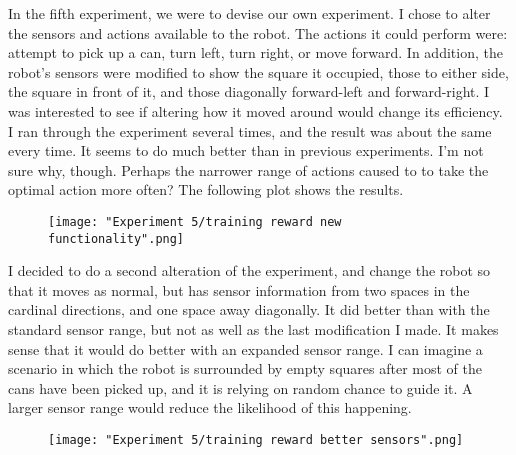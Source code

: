 \documentclass{article}
\begin{document}
\begin{flushleft}
In the fifth experiment, we were to devise our own experiment.  I chose to alter the sensors and actions available to the robot.  The actions it could perform were: attempt to pick up a can, turn left, turn right, or move forward.  In addition, the robot's sensors were modified to show the square it occupied, those to either side, the square in front of it, and those diagonally forward-left and forward-right.  I was interested to see if altering how it moved around would change its efficiency.  I ran through the experiment several times, and the result was about the same every time.  It seems to do much better than in previous experiments.  I'm not sure why, though.  Perhaps the narrower range of actions caused to to take the optimal action more often?  The following plot shows the results.
\end{flushleft}

\begin{figure}[h!]
    \noindent\texttt{[image: "Experiment 5/training reward new functionality".png]}
\end{figure}

\clearpage
\begin{flushleft}
I decided to do a second alteration of the experiment, and change the robot so that it moves as normal, but has sensor information from two spaces in the cardinal directions, and one space away diagonally.  It did better than with the standard sensor range, but not as well as the last modification I made.  It makes sense that it would do better with an expanded sensor range.  I can imagine a scenario in which the robot is surrounded by empty squares after most of the cans have been picked up, and it is relying on random chance to guide it.  A larger sensor range would reduce the likelihood of this happening. 
\end{flushleft}

\begin{figure}[h!]
    \noindent\texttt{[image: "Experiment 5/training reward better sensors".png]}
\end{figure}
\end{document}
